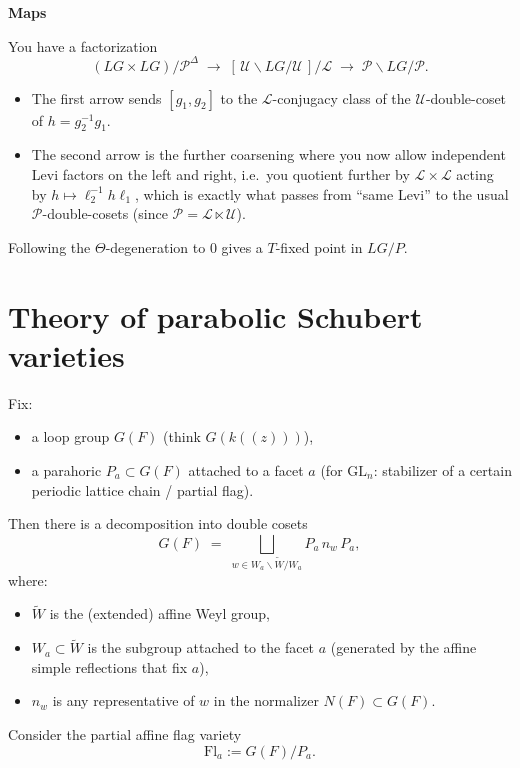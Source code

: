 \documentclass[12pt]{article}
\begin{document}
\begin{remark}
\textbf{Maps}

You have a factorization
\[
(LG\times LG)/\mathcal{P}^\Delta
\;\longrightarrow\;
[\,\mathcal{U}\backslash LG/\mathcal{U}\,]/\mathcal{L}
\;\longrightarrow\;
\mathcal{P}\backslash LG/\mathcal{P}.
\]
\begin{itemize}
    \item The first arrow sends $[g_1,g_2]$ to the $\mathcal{L}$-conjugacy class of the $\mathcal{U}$-double-coset of $h=g_2^{-1}g_1$.
    \item The second arrow is the further coarsening where you now allow independent Levi factors on the left and right, i.e.\ you quotient further by $\mathcal{L}\times \mathcal{L}$ acting by $h\mapsto \ell_2^{-1}h\ell_1$, which is exactly what passes from ``same Levi'' to the usual $\mathcal{P}$-double-cosets (since $\mathcal{P}=\mathcal{L}\ltimes\mathcal{U}$).
\end{itemize}
\end{remark}

Following the $\Theta$-degeneration to $0$ gives a $T$-fixed point in $LG/P$.

\section{Theory of parabolic Schubert varieties}

Fix:
\begin{itemize}
    \item a loop group $G(F)$ (think $G(k((z)))$),
    \item a parahoric $P_a \subset G(F)$ attached to a facet $a$ (for $\mathrm{GL}_n$: stabilizer of a certain periodic lattice chain / partial flag).
\end{itemize}

Then there is a decomposition into double cosets
\[
G(F) \;=\; \bigsqcup_{w \in W_a \backslash \widetilde{W} / W_a} P_a \, n_w \, P_a,
\]
where:
\begin{itemize}
    \item $\widetilde{W}$ is the (extended) affine Weyl group,
    \item $W_a \subset \widetilde{W}$ is the subgroup attached to the facet $a$ (generated by the affine simple reflections that fix $a$),
    \item $n_w$ is any representative of $w$ in the normalizer $N(F) \subset G(F)$.
\end{itemize}

Consider the partial affine flag variety
\[
\mathrm{Fl}_a := G(F)/P_a.
\]
\end{document}
